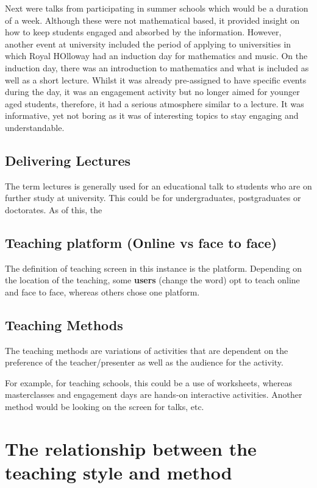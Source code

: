 \documentclass[12pt, a4paper,oneside]{book}
\numberwithin{equation}{section}
\begin{document}
 Next were talks from participating in summer schools which would be a duration of a week. Although these were not mathematical based, it provided insight on how to keep students engaged and {\color{red}absorbed} by the information. However, another event at university included the period of applying to universities in which Royal HOlloway had an induction day for mathematics and music. On the induction day, there was an introduction to mathematics and what is included as well as a short lecture. Whilst it was already pre-assigned to have specific events during the day, it was an engagement activity but no longer aimed for younger aged students, therefore, it had a serious atmosphere similar to a lecture. It was informative, yet not boring as it was of interesting topics to stay engaging and understandable.

\subsection{Delivering Lectures}
The term lectures is generally used for an educational talk to students who are on further study at university. This could be for undergraduates, postgraduates or doctorates. As of this, the

\subsection{Teaching platform (Online vs face to face)}

The definition of teaching screen in this instance is the platform. Depending on the location of the teaching, some \textbf{users} (change the word) opt to teach online and face to face, whereas others chose one platform.

\subsection{Teaching Methods}

The teaching methods are variations of activities that are dependent on the preference of the teacher/presenter as well as the audience for the activity.

For example, for teaching schools, this could be a use of worksheets, whereas masterclasses and engagement days are hands-on interactive activities. Another method would be looking on the screen for talks, etc.

\section{The relationship between the teaching style and method}
\end{document}
